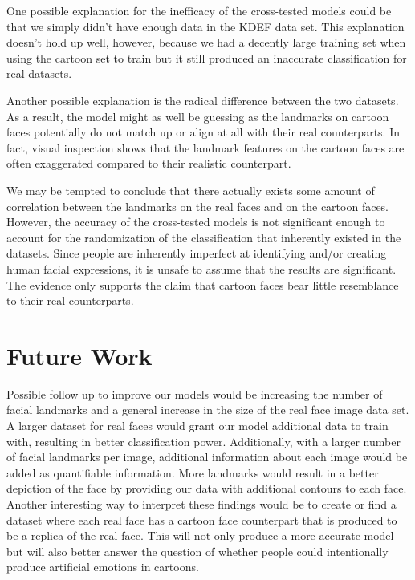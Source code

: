 \documentclass{Project}
\begin{document}
One possible explanation for the inefficacy of the cross-tested models could be that we simply didn't have 
enough data in the KDEF data set. This explanation doesn't hold up well, however, because we had a decently 
large training set when using the cartoon set to train but it still produced an inaccurate classification for 
real datasets. 

Another possible explanation is the radical difference between the two datasets. As a result, the model might 
as well be guessing as the landmarks on cartoon faces potentially do not match up or align at all with their 
real counterparts. In fact, visual inspection shows that the landmark features on the cartoon faces are often 
exaggerated compared to their realistic counterpart.

We may be tempted to conclude that there actually exists some amount of correlation between the landmarks on 
the real faces and on the cartoon faces. However, the accuracy of the cross-tested models is not significant 
enough to account for the randomization of the classification that inherently existed in the datasets.
Since people are inherently imperfect at identifying and/or creating human facial expressions, it is unsafe to 
assume that the results are significant. The evidence only supports the claim that cartoon faces bear little 
resemblance to their real counterparts. 

\section{Future Work}
Possible follow up to improve our models would be increasing the number of facial landmarks and a general 
increase in the size of the real face image data set. A larger dataset for real faces would grant our model 
additional data to train with, resulting in better classification power. Additionally, with a larger number of 
facial landmarks per image, additional information about each image would be added as quantifiable information.
More landmarks would result in a better depiction of the face by providing our data with additional contours to
each face. \\

Another interesting way to interpret these findings would be to create or find a dataset where each real face
has a cartoon face counterpart that is produced to be a replica of the real face. This will not only produce a
more accurate model but will also better answer the question of whether people could intentionally produce
artificial emotions in cartoons.
\end{document}
